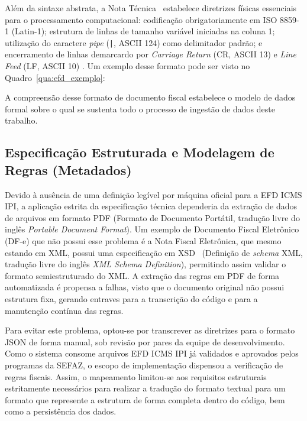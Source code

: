 Além da sintaxe abstrata, a Nota Técnica~\cite{nota_tecnica_efd} estabelece
diretrizes físicas essenciais para o processamento computacional: codificação
obrigatoriamente em ISO 8859-1 (Latin-1); estrutura de linhas de tamanho
variável iniciadas na coluna 1; utilização do caractere \textit{pipe}
(\texttt{|}, ASCII 124) como delimitador padrão; e encerramento de linhas
demarcardo por \textit{Carriage Return} (CR, ASCII 13) e \textit{Line Feed}
(LF, ASCII 10) \cite{nota_tecnica_efd}. Um exemplo desse formato pode ser
visto no Quadro~\ref{qua:efd_exemplo}:


A compreensão desse formato de documento fiscal estabelece o modelo de dados
formal sobre o qual se sustenta todo o processo de ingestão de dados deste
trabalho.

\subsection{Especificação Estruturada e Modelagem de Regras (Metadados)}
\label{sec:especificacao_regras}

Devido à ausência de uma definição legível por máquina oficial para a
EFD ICMS IPI, a aplicação estrita da especificação técnica dependeria da
extração de dados de arquivos em formato PDF (Formato de Documento Portátil,
tradução livre do inglês \textit{Portable Document Format}).
Um exemplo de Documento Fiscal Eletrônico (DF-e) que não possui esse problema
é a Nota Fiscal Eletrônica, que mesmo estando em XML, possui uma especificação
em XSD~\cite{schemas_nfe_2026} (Definição de \textit{schema} XML, tradução
livre do inglês \textit{XML Schema Definition}), permitindo assim validar o
formato semiestruturado do XML. A extração das regras em PDF de forma
automatizada é propensa a falhas, visto que o documento original não possui
estrutura fixa, gerando entraves para a transcrição do código e para a
manutenção contínua das regras.

Para evitar este problema, optou-se por transcrever as diretrizes para o formato
JSON de forma manual, sob revisão por pares da equipe de desenvolvimento. Como
o sistema consome arquivos EFD ICMS IPI já validados e aprovados pelos
programas da SEFAZ, o escopo de implementação dispensou a verificação de regras
fiscais. Assim, o mapeamento limitou-se aos requisitos estruturais estritamente
necessários para realizar a tradução do formato textual para um formato que
represente a estrutura de forma completa dentro do código, bem como a
persistência dos dados.

